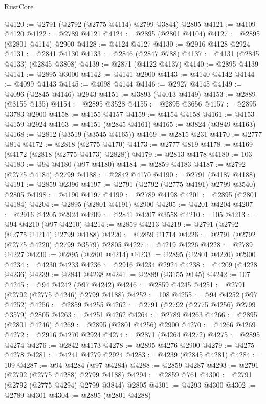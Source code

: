 \begin{lexlean}{RustCore}
\begin{coremodule}
@4120 := @2791 (@2792 (@2775 @4114) @2799 @3844) @2805
@4121 := @4109 @4120
@4122 := @2789 @4121
@4124 := @2895 (@2801 @4104)
@4127 := @2895 (@2801 @4114) @2900
@4128 := @4124 @4127
@4130 := @2916 @4128 @2924
@4131 := @2841 @4130
@4133 := @2846 (@2847 @788)
@4137 := @4131 (@2845 @4133) (@2845 @3808)
@4139 := @2871 (@4122 @4137)
@4140 := @2895 @4139
@4141 := @2895 @3000
@4142 := @4141 @2900
@4143 := @4140 @4142
@4144 := @4099 @4143
@4145 := @4098 @4144
@4146 := @2927 @4145
@4149 := @4096 (@2845 @4146) @2943
@4151 := @3893 (@4013 @4149)
@4153 := @2889 (@3155 @135)
@4154 := @2895 @3528
@4155 := @2895 @3656
@4157 := @2895 @3783 @2900
@4158 := @4155 @4157
@4159 := @4154 @4158
@4161 := @4153 @4159 @2924
@4163 := @4151 (@2845 @4161)
@4165 := @3824 (@3849 @4163)
@4168 := @2812 (@3519 (@3545 @4165))
@4169 := @2815 @231
@4170 := @2777 @814
@4172 := @2818 (@2775 @4170)
@4173 := @2777 @819
@4178 := @4169 (@4172 (@2818 (@2775 @4173) @2828))
@4179 := @2813 @4178
@4180 := 103
@4183 := @94 @4180 (@97 @4180)
@4184 := @2859 @4183
@4187 := @2792 (@2775 @4184) @2799
@4188 := @2842 @4170
@4190 := @2791 (@4187 @4188)
@4191 := @2859 @2396
@4197 := @2791 (@2792 (@2775 @4191) @2799 @3540) @2805
@4198 := @4190 @4197
@4199 := @2789 @4198
@4201 := @2895 (@2801 @4184)
@4204 := @2895 (@2801 @4191) @2900
@4205 := @4201 @4204
@4207 := @2916 @4205 @2924
@4209 := @2841 @4207 @3558
@4210 := 105
@4213 := @94 @4210 (@97 @4210)
@4214 := @2859 @4213
@4219 := @2791 (@2792 (@2775 @4214) @2799 @4188)
@4220 := @2859 @1714
@4226 := @2791 (@2792 (@2775 @4220) @2799 @3579) @2805
@4227 := @4219 @4226
@4228 := @2789 @4227
@4230 := @2895 (@2801 @4214)
@4233 := @2895 (@2801 @4220) @2900
@4234 := @4230 @4233
@4236 := @2916 @4234 @2924
@4238 := @4209 (@4228 @4236)
@4239 := @2841 @4238
@4241 := @2889 (@3155 @145)
@4242 := 107
@4245 := @94 @4242 (@97 @4242)
@4246 := @2859 @4245
@4251 := @2791 (@2792 (@2775 @4246) @2799 @4188)
@4252 := 108
@4255 := @94 @4252 (@97 @4252)
@4256 := @2859 @4255
@4262 := @2791 (@2792 (@2775 @4256) @2799 @3579) @2805
@4263 := @4251 @4262
@4264 := @2789 @4263
@4266 := @2895 (@2801 @4246)
@4269 := @2895 (@2801 @4256) @2900
@4270 := @4266 @4269
@4272 := @2916 @4270 @2924
@4274 := @2871 (@4264 @4272)
@4275 := @2895 @4274
@4276 := @2842 @4173
@4278 := @2895 @4276 @2900
@4279 := @4275 @4278
@4281 := @4241 @4279 @2924
@4283 := @4239 (@2845 @4281)
@4284 := 109
@4287 := @94 @4284 (@97 @4284)
@4288 := @2859 @4287
@4293 := @2791 (@2792 (@2775 @4288) @2799 @4188)
@4294 := @2859 @761
@4300 := @2791 (@2792 (@2775 @4294) @2799 @3844) @2805
@4301 := @4293 @4300
@4302 := @2789 @4301
@4304 := @2895 (@2801 @4288)

\end{coremodule}
\end{lexlean}
